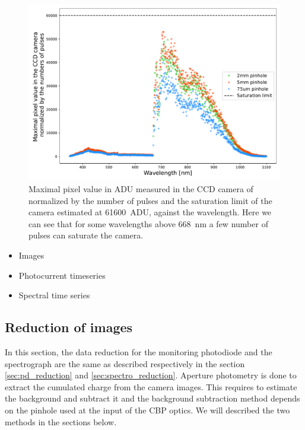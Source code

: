 \begin{figure}[h]
    \centering
    \includegraphics[width=\columnwidth]{fig/saturation_lim_ccd.pdf}
    \caption{Maximal pixel value in ADU measured in the CCD camera of \SD normalized by the number of pulses and the saturation limit of the camera estimated at \SI{61600}{ADU}, against the wavelength. Here we can see that for some wavelengths above \SI{668}{\nano\meter} a few number of pulses can saturate the camera.}
    \label{fig:saturation_lim}
\end{figure}


\begin{itemize}
\item Images
\item Photocurrent timeseries
\item Spectral time series
\end{itemize}

\subsection{Reduction of images}
\label{sec:photometry}

In this section, the data reduction for the monitoring photodiode and the spectrograph are the same as described respectively in the section \ref{sec:pd_reduction} and \ref{sec:spectro_reduction}. Aperture photometry is done to extract the cumulated charge from the \SD camera images. This requires to estimate the background and subtract it and the background subtraction method depends on the pinhole used at the input of the CBP optics. We will described the two methods in the sections below.

